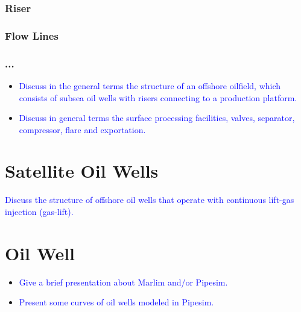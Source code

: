 \subsubsection{Riser}



\subsubsection{Flow Lines}

\subsubsection{...}

\begin{itemize}

\item \textcolor{blue}{Discuss in the general terms the structure of an offshore oilfield, which consists of subsea oil wells with risers connecting to a production platform.}

\item \textcolor{blue}{Discuss in general terms the surface processing facilities, valves, separator, compressor, flare and exportation.}

\end{itemize}


\section{Satellite Oil Wells}

\textcolor{blue}{Discuss the structure of offshore oil wells that operate with continuous lift-gas injection (gas-lift).}



\section{Oil Well}


\begin{itemize}

\item \textcolor{blue}{Give a brief presentation about Marlim and/or Pipesim.}

\item \textcolor{blue}{Present some curves of oil wells modeled in Pipesim.}


\end{itemize}
